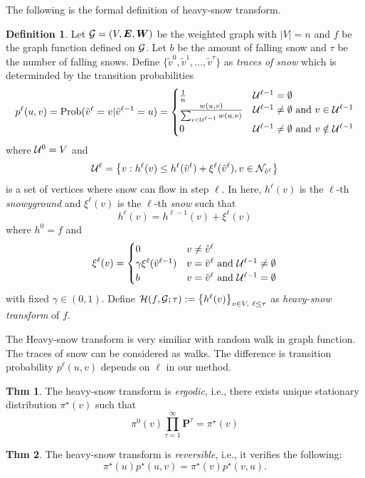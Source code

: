\documentclass[preprint, review, 12pt]{article}
\theoremstyle{definition}
\newtheorem{dfn}{Definition}
\newtheorem{thm}{Thm}[section]
\theoremstyle{remark}
\begin{document}
The following is the formal definition of heavy-snow transform.
\begin{dfn}\label{snow:df_hst}
Let ${\cal G}=(V,{\boldsymbol E},{\boldsymbol W})$ be the weighted graph with $|V|=n$ and $f$ be the graph function defined on ${\cal G}$. Let $b$ be the amount of falling snow and $\tau$ be the number of falling snows. Define $\{\tilde v^0,\tilde v^1,\dots ,\tilde v^{\tau}\}$ as \emph{traces of snow} which is determinded by the transition probabilities 
\[
p^{\ell}(u,v)=
\mbox{Prob}(\tilde v^{\ell}=v|\tilde v^{\ell-1}=u)
=\begin{cases}
\frac{1}{n}  & {\cal U}^{\ell-1}= \emptyset \\ 
\frac{w(u,v)}{\sum_{v\in {\cal U}^{\ell-1}} w(u,v)} & {\cal U}^{\ell-1}\neq \emptyset 
\mbox{ and } v \in {\cal U}^{\ell-1}\\ 
0 & {\cal U}^{\ell-1}\neq \emptyset \mbox{ and } v \notin {\cal U}^{\ell-1}
\end{cases}
\]
where ${\cal U}^0=V$ and 
\[
{\cal U}^{\ell}=\big\{v: h^{\ell}(v)\leq h^{\ell}(\tilde v^{\ell})+\xi^{\ell}(\tilde v^{\ell}), v\in {\cal N}_{\tilde v^{\ell}}\big\}
\]
is a set of vertices where snow can flow in step $\ell$. In here, $h^{\ell}(v)$ is the $\ell$-th \emph{snowyground} and $\xi^{\ell}(v)$ is the $\ell$-th \emph{snow} such that 
\[
h^{\ell}(v)=h^{\ell-1}(v)+\xi^{\ell}(v)
\]
where $h^{0}=f$ and 
\[
\xi^{\ell}(v)=	\begin{cases}
0 & v \neq  \tilde v^{\ell} \\
\gamma \xi^{\ell}(\tilde v^{\ell-1})  & v =  \tilde v^{\ell} \mbox{ and } {\cal U}^{\ell-1}\neq \emptyset \\
b &  v = \tilde v^{\ell} \mbox{ and } {\cal U}^{\ell-1} = \emptyset
\end{cases}
\]
with fixed $\gamma\in(0,1)$. 
Define ${\cal H}(f,{\cal G};\tau):=\big\{h^{\ell}(v)\big\}_{v \in V,~\ell \leq\tau }$ as \emph{heavy-snow transform} of $f$. 
\end{dfn}
The Heavy-snow transform is very similiar with random walk in graph function. The traces of snow can be considered as walks. The difference is transition probability $p^{\ell}(u,v)$ depends on $\ell$ in our method. 
\begin{thm}
The heavy-snow transform is \emph{ergodic}, i.e., there exists unique stationary distribution $\pi^{\star}(v)$ such that 
\[
\pi^{0}(v)\prod_{\tau=1}^{\infty}{\boldsymbol P}^{\tau}=\pi^{\star}(v)
\]
\end{thm}
\begin{thm}
The heavy-snow transform is \emph{reversible}, i.e., it verifies the following:
\[
\pi^{\star}(u)p^{\star}(u,v)=\pi^{\star}(v)p^{\star}(v,u).
\]
\end{thm}
\end{document}
